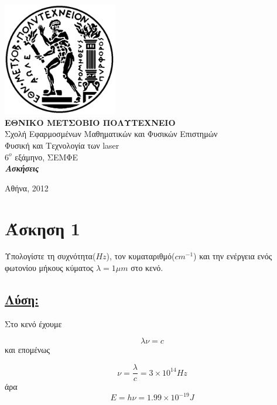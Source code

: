 \documentclass[a4paper,11pt,titlepage]{article}
\begin{document}

\begin{titlepage}
\begin{center}
\includegraphics[width=50mm]{pyrforos.pdf}\\[0.5cm]
\textbf{\LARGE ΕΘΝΙΚΟ ΜΕΤΣΟΒΙΟ ΠΟΛΥΤΕΧΝΕΙΟ}\\
\textrm{\Large Σχολή Εφαρμοσμένων Μαθηματικών και Φυσικών Επιστημών}\\[2.0cm]
\Huge{Φυσική και Τεχνολογία των laser\\}
\Large{\textit{$6^o$} εξάμηνο, ΣΕΜΦΕ}\\[2.0cm]
\Large{\textit{\textbf{Ασκήσεις}}}\\[5.0cm]
\normalsize

\vfill
{Αθήνα, 2012}

\end{center}
\end{titlepage}

\section{Άσκηση 1}
Υπολογίστε τη συχνότητα($Hz$), τον κυματαριθμό($cm^{-1}$) και την ενέργεια ενός φωτονίου μήκους κύματος $\lambda=1{\mu}m$ στο κενό.

\subsection*{\underline{Λύση:}}

Στο κενό έχουμε 

\begin{equation}
 \lambda\nu=c
\end{equation}
 και επομένως

\begin{equation}
 \nu=\frac{\lambda}{c}=3\times10^{14} Hz
\end{equation}
άρα
\begin{equation}
 E=h\nu=1.99\times10^{-19}J
\end{equation}
\end{document}
